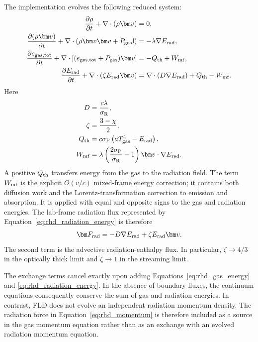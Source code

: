 The implementation evolves the following reduced system:
\begin{align}
    \frac{\partial \rho}{\partial t}
    +\nabla\cdot(\rho\bm v)
    &=0,
    \label{eq:rhd_mass}\\
    \frac{\partial(\rho\bm v)}{\partial t}
    +\nabla\cdot
    \left(\rho\bm v\bm v+P_{\rm gas}{\sf I}\right)
    &=-\lambda\nabla E_{\rm rad},
    \label{eq:rhd_momentum}\\
    \frac{\partial e_{\rm gas,tot}}{\partial t}
    +\nabla\cdot
    \left[(e_{\rm gas,tot}+P_{\rm gas})\bm v\right]
    &=-Q_{\rm th}+W_{\rm mf},
    \label{eq:rhd_gas_energy}\\
    \frac{\partial E_{\rm rad}}{\partial t}
    +\nabla\cdot\left(\zeta E_{\rm rad}\bm v\right)
    &=\nabla\cdot\left(D\nabla E_{\rm rad}\right)
      +Q_{\rm th}-W_{\rm mf}.
    \label{eq:rhd_radiation_energy}
\end{align}
Here
\begin{align}
    D&=\frac{c\lambda}{\sigma_{\rm R}},
    \label{eq:fld_diffusion_coefficient}\\
    \zeta&=\frac{3-\chi}{2},
    \label{eq:radiation_advection_factor}\\
    Q_{\rm th}
    &=c\sigma_{\rm P}
      \left(aT_{\rm gas}^{4}-E_{\rm rad}\right),
    \label{eq:thermal_coupling}\\
    W_{\rm mf}
    &=\lambda\left(\frac{2\sigma_{\rm P}}{\sigma_{\rm R}}-1\right)
      \bm v\cdot\nabla E_{\rm rad}.
    \label{eq:mixed_frame_work}
\end{align}
A positive $Q_{\rm th}$ transfers energy from the gas to the radiation field.
The term $W_{\rm mf}$ is the explicit $O(v/c)$ mixed-frame energy correction;
it contains both diffusion work and the Lorentz-transformation correction to
emission and absorption.  It is applied with equal and opposite signs to the
gas and radiation energies.  The lab-frame radiation flux represented by
Equation~\eqref{eq:rhd_radiation_energy} is therefore
\begin{align}
    \bm F_{\rm rad}
    =-D\nabla E_{\rm rad}+\zeta E_{\rm rad}\bm v.
    \label{eq:lab_frame_radiation_flux}
\end{align}
The second term is the advective radiation-enthalpy flux.  In particular,
$\zeta\rightarrow4/3$ in the optically thick limit and
$\zeta\rightarrow1$ in the streaming limit.

The exchange terms cancel exactly upon adding
Equations~\eqref{eq:rhd_gas_energy} and
\eqref{eq:rhd_radiation_energy}.  In the absence of boundary fluxes, the
continuum equations consequently conserve the sum of gas and radiation
energies.  In contrast, FLD does not evolve an independent radiation momentum
density.  The radiation force in Equation~\eqref{eq:rhd_momentum} is therefore
included as a source in the gas momentum equation rather than as an exchange
with an evolved radiation momentum equation.

